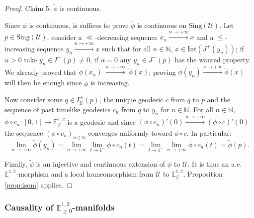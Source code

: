 \documentclass[a4paper,12pt]{article}
\def\U{\mathcal U}
\def\N{\mathbb N}
\def\sing{\mathrm{Sing}}
\newcommand{\mass}[1]{{\mathbb E}^{1,2}_{#1}}
\begin{document}
\begin{proof}
\item Claim 5: {$\widetilde \phi$ is continuous.}

 Since $\phi$ is continuous, is suffices to prove $\widetilde \phi$ is continuous on $\sing(\U)$. Let $p\in \sing(\U)$, consider a $\ll$-decreasing sequence $x_n\xrightarrow{n\rightarrow +\infty}x$ and a $\leq$-increasing sequence $y_n\xrightarrow{n\rightarrow +\infty} x$ such that for all $n\in \N$, $x\in \mathrm{Int}(J^+(y_n))$; if $\alpha>0$ take $y_n\in I^-(p) \neq 0$, if $\alpha=0$ any $y_n\in J^-(p)$ has the wanted property. We already proved that $\phi(x_n)~\xrightarrow{n\rightarrow+\infty}~\widetilde\phi(x)$;  proving $\phi(y_n)\xrightarrow{n\rightarrow +\infty}\widetilde\phi(x)$ will then be enough since $\widetilde \phi$ is increasing.

Now consider some $q\in I^+_\U(p)$, the unique geodesic $c$ from $q$ to $p$ and the sequence of past timelike geodesics $c_n$ from $q$ to $y_n$ for $n\in\N$. For all $n\in \N$, $\phi\circ c_n: [0,1] \rightarrow \mass{\beta}$ is a geodesic and since $(\phi \circ c_n)'(0) \xrightarrow{n\rightarrow +\infty} (\phi \circ c)'(0)$ the sequence $(\phi \circ c_n)_{n\in\N}$ converges uniformly toward $\phi \circ c$. In particular: 
$$\lim_{n\rightarrow +\infty} \widetilde \phi(y_n)=\lim_{n\rightarrow +\infty}\lim_{t\rightarrow 1^-} \phi\circ c_n(t) = \lim_{t\rightarrow 1^-}\lim_{n\rightarrow +\infty} \phi\circ c_n(t)= \widetilde \phi(p).$$





Finally, $\widetilde \phi$ is an injective and continuous extension of $\phi$ to $\U$. It is thus an a.e. $\mass{}$-morphism and a local homeomorphism from $\U$ to $\mass{\beta}$,  Proposition \ref{prop:isom} applies. 
 
\end{proof}

\subsubsection*{Causality of $\mass{\geq0}$-manifolds}
\end{document}
